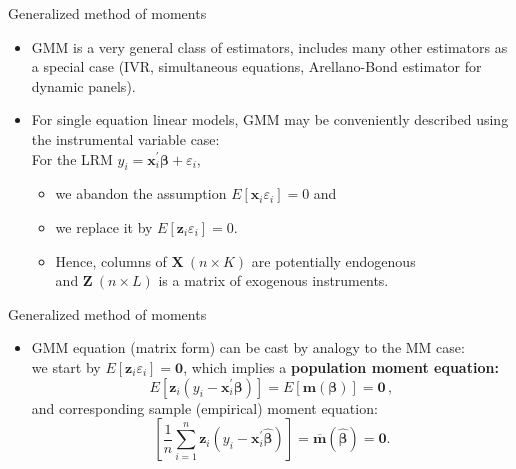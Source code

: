 \documentclass{beamer}
\begin{document}
\begin{frame}{Generalized method of moments}
\begin{itemize}
    \item GMM is a very general class of estimators, includes many other estimators as a special case (IVR, simultaneous equations, Arellano-Bond estimator for dynamic panels). 
    \medskip
    \item For single equation linear models, GMM may be conveniently described using the instrumental variable case:\\ \bigskip For the LRM $y_i = \bm{x}_i^{\prime}\bm{\beta} + \varepsilon_i$, 
    \begin{itemize}
    \medskip
        \item  we abandon the assumption $E[\bm{x}_i \varepsilon_i]=0$ and
        \medskip
        \item we replace it by $E[\bm{z}_i \varepsilon_i]=0$.
        \medskip
        \item Hence, columns of $\bm{X}~(n\!\times\!K)$ are potentially endogenous \\ \medskip and $\bm{Z}~(n\!\times\!L)$ is a matrix of exogenous instruments.
    \end{itemize}
\end{itemize}
\end{frame}
\begin{frame}{Generalized method of moments}
\begin{itemize}
\item GMM equation (matrix form) can be cast by analogy to the MM case: \\ \bigskip we start by $E[\bm{z}_i \varepsilon_i]=\bm{0}$, which implies a \textbf{population moment equation:}
$$
E \left[ \bm{z}_i (y_i - \bm{x}_i^{\prime}\bm{\beta}) \right] 
= E \left[ \mathbf{m}(\bm{\beta}) \right] = \bm{0}\,,
$$
and corresponding sample (empirical) moment equation:
$$
\left[ \frac{1}{n} \sum_{i=1}^n \bm{z}_i (y_i - \bm{x}_i^{\prime}\hat{\bm{\beta}}) \right]
= \overline{\mathbf{m}}(\hat{\bm{\beta}}) = \bm{0}.
$$
\end{itemize}

\end{frame}
\end{document}
